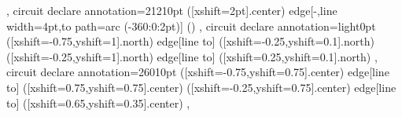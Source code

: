 {{  },
 circuit declare annotation={2121}{0pt} %
  {
   ([xshift=2pt]\tikzlastnode.center) edge[-,line width=4pt,to path={arc (-360:0:2pt)}] ()
  },
 circuit declare annotation={light}{0pt} %
  {
   ([xshift=-0.75\tikzcircuitssizeunit,yshift=1\tikzcircuitssizeunit]\tikzlastnode.north) edge[line to] ([xshift=-0.25\tikzcircuitssizeunit,yshift=0.1\tikzcircuitssizeunit]\tikzlastnode.north)
   ([xshift=-0.25\tikzcircuitssizeunit,yshift=1\tikzcircuitssizeunit]\tikzlastnode.north) edge[line to] ([xshift=0.25\tikzcircuitssizeunit,yshift=0.1\tikzcircuitssizeunit]\tikzlastnode.north)
  },
 circuit declare annotation={2601}{0pt} %
  {
   ([xshift=-0.75\tikzcircuitssizeunit,yshift=0.75\tikzcircuitssizeunit]\tikzlastnode.center) edge[line to] ([xshift=0.75\tikzcircuitssizeunit,yshift=0.75\tikzcircuitssizeunit]\tikzlastnode.center)
   ([xshift=-0.25\tikzcircuitssizeunit,yshift=0.75\tikzcircuitssizeunit]\tikzlastnode.center) edge[line to] ([xshift=0.65\tikzcircuitssizeunit,yshift=0.35\tikzcircuitssizeunit]\tikzlastnode.center)
  },
}

\makeatletter
\newcommand\currentcoordinate{\the\tikz@lastxsaved,\the\tikz@lastysaved}

\newcommand{\crossings}[2]{
 \fill [name intersections={of=#1 and #2, name=i, total=\t}]
 \foreach \s in {1,...,\t}{(i-\s) node[crossing] {}};
}
\makeatother

\endinput
